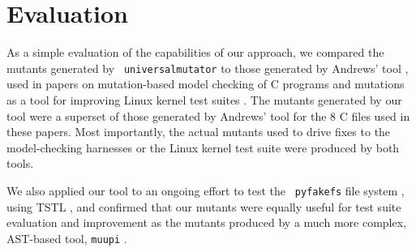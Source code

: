 \section{Evaluation}

As a simple evaluation of the capabilities of our approach, we compared the mutants generated by {\tt
  universalmutator} to those generated by Andrews' tool \cite{mutant},
used in papers on mutation-based model checking of C programs
\cite{ASE15} and mutations as a tool for improving Linux kernel test
suites \cite{mutation17}.  The mutants generated by our tool were a
superset of those generated by Andrews' tool for the 8 C files used in
these papers.  Most importantly, the actual mutants used to drive
fixes to the model-checking harnesses or the Linux kernel test suite
were produced by both tools.

We also applied our tool to an ongoing effort to test the {\tt
  pyfakefs} file system \cite{pyfakefs}, using TSTL \cite{nfm15,tstlsttt},
and confirmed that our mutants were equally useful for test suite
evaluation and improvement as the mutants produced by a much more
complex, AST-based tool, {\tt muupi} \cite{muupi}.